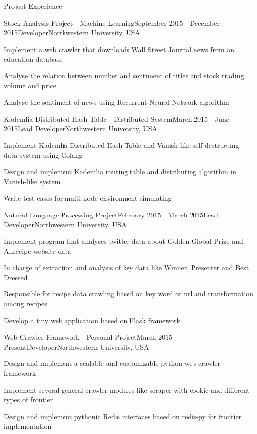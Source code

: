 \documentclass{resume} %
\begin{document}
\begin{rSection}{Project Experience}

\begin{rSubsection}{Stock Analysis Project - Machine Learning}{September 2015 - December 2015}{Developer}{Northwestern University, USA}
\item Implement a web crawler that downloads Wall Street Journal news from an education database
\item Analyse the relation between number and sentiment of titles and stock trading volume and price
\item Analyse the sentiment of news using Recurrent Neural Network algorithm
\end{rSubsection}

\begin{rSubsection}{Kademlia Distributed Hash Table - Distributed System}{March 2015 - June 2015}{Lead Developer}{Northwestern University, USA}
\item Implement Kademlia Distributed Hash Table and Vanish-like self-destructing data system using Golang
\item Design and implement Kademlia routing table and distributing algorithm in Vanish-like system
\item Write test cases for multi-node environment simulating
\end{rSubsection}

\begin{rSubsection}{Natural Language Processing Project}{February 2015 - March 2015}{Lead Developer}{Northwestern University, USA}
\item Implement program that analyses twitter data about Golden Global Prize and Allrecipe website data
\item In charge of extraction and analysis of key data like Winner, Presenter and Best Dressed
\item Responsible for recipe data crawling based on key word or url and transformation among recipes
\item Develop a tiny web application based on Flask framework
\end{rSubsection}

\begin{rSubsection}{Web Crawler Framework - Personal Project}{March 2015 - Present}{Developer}{Northwestern University, USA}
\item Design and implement a scalable and customizable python web crawler framework
\item Implement several general crawler modules like scraper with cookie and different types of frontier
\item Design and implement pythonic Redis interfaces based on redis-py for frontier implementation
\end{rSubsection}

\end{rSection}
\end{document}
